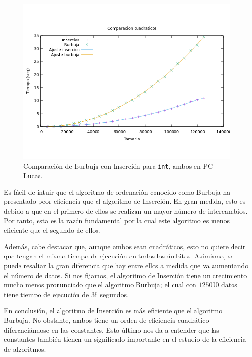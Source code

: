 \documentclass[12pt]{article}
\begin{document}
    \begin{figure}
        \centering
        \includegraphics[width=0.85\linewidth]{images/Comparaciones/Comparacion_cuadraticos.png}
        \cprotect\caption{Comparación de Burbuja con Inserción para \verb|int|, ambos en PC Lucas.}
        \label{fig:comp_cuadraticos}
    \end{figure}

    Es fácil de intuir que el algoritmo de ordenación conocido como Burbuja ha presentado peor eficiencia que el algoritmo de Inserción. En gran medida, esto es debido a que en el primero de ellos se realizan un mayor número de intercambios. Por tanto, esta es la razón fundamental por la cual este algoritmo es menos eficiente que el segundo de ellos. 

    Además, cabe destacar que, aunque ambos sean cuadráticos, esto no quiere decir que tengan el mismo tiempo de ejecución en todos los ámbitos. Asimismo, se puede resaltar la gran diferencia que hay entre ellos a medida que va aumentando el número de datos. Si nos fijamos, el algoritmo de Inserción tiene un crecimiento mucho menos pronunciado que el algoritmo Burbuja; el cual con $125000$ datos tiene tiempo de ejecución de $35$ segundos. 

    En conclusión, el algoritmo de Inserción es más eficiente que el algoritmo Burbuja. No obstante, ambos tiene un orden de eficiencia cuadrático diferenciándose en las constantes. Esto último nos da a entender que las constantes también tienen un significado importante en el estudio de la eficiencia de algoritmos.
\end{document}
